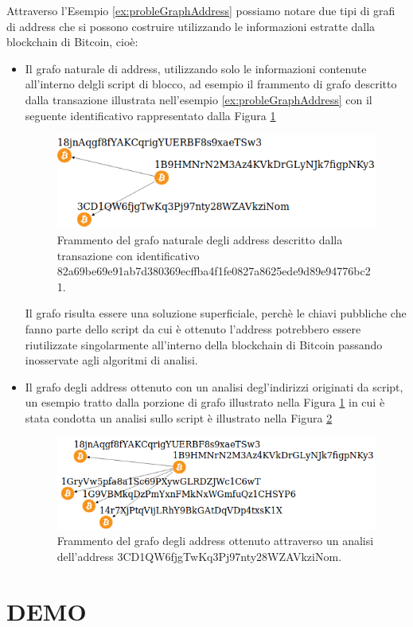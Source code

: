  Attraverso l'Esempio \ref{ex:probleGraphAddress} possiamo notare due tipi di grafi di address che si possono costruire utilizzando le informazioni estratte dalla blockchain di Bitcoin, cioè:
 \begin{itemize}
   \item Il grafo naturale di address, utilizzando solo le informazioni contenute all'interno delgli script di blocco, ad esempio il frammento di grafo descritto dalla transazione illustrata nell'esempio \ref{ex:probleGraphAddress} con il seguente identificativo  rappresentato dalla Figura \ref{fig:addGrapjNatural}
   \begin{figure}[H]
   \centering
   \includegraphics[scale=0.35]{images/exampleWithGraph/naturalAddressGrahScamTx.png}
   \caption{Frammento del grafo naturale degli address descritto dalla transazione con identificativo 82\-a69\-be69e\-91ab7\-d3803\-69ec\-ffba4f\-1fe08\-27a862\-5ede9\-d89e9\-4776b\-c21.\label{fig:addGrapjNatural}}
   \end{figure}
   Il grafo risulta essere una soluzione superficiale, perchè le chiavi pubbliche che fanno parte dello script da cui è ottenuto l'address  potrebbero essere riutilizzate singolarmente all'interno della blockchain di Bitcoin passando inosservate agli algoritmi di analisi.
   \item Il grafo degli address ottenuto con un analisi degl'indirizzi originati da script, un esempio tratto dalla porzione di grafo illustrato nella Figura \ref{fig:addGrapjNatural} in cui è stata condotta un analisi sullo script  è illustrato nella Figura \ref{fig:addGraphAnalisis}
   \begin{figure}[H]
   \centering
   \includegraphics[scale=0.35]{images/exampleWithGraph/decode-address-graph-scam.png}
   \caption{Frammento del grafo degli address ottenuto attraverso un analisi dell'address 3CD1\-QW6fjg\-TwKq3Pj\-97nty28W\-ZAVkz\-iNom.\label{fig:addGraphAnalisis}}
   \end{figure}
 \end{itemize}


\section{DEMO} \label{sec:solDemo}
